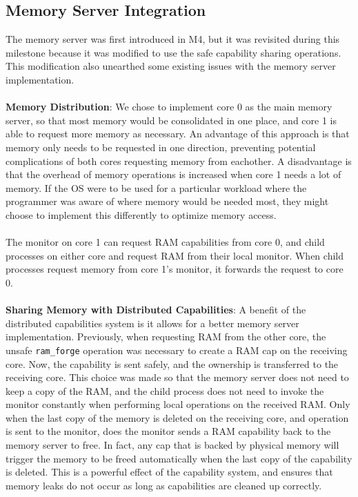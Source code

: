 \subsection{Memory Server Integration}
The memory server was first introduced in M4, but it was revisited during this milestone because it was modified to use the safe capability sharing operations. This modification also unearthed some existing issues with the memory server implementation.
\\\\
\textbf{Memory Distribution}:
We chose to implement core 0 as the main memory server, so that most memory would be consolidated in one place, and core 1 is able to request more memory as necessary. An advantage of this approach is that memory only needs to be requested in one direction, preventing potential complications of both cores requesting memory from eachother. A disadvantage is that the overhead of memory operations is increased when core 1 needs a lot of memory. If the OS were to be used for a particular workload where the programmer was aware of where memory would be needed most, they might choose to implement this differently to optimize memory access.
\\\\
The monitor on core 1 can request RAM capabilities from core 0, and child processes on either core and request RAM from their local monitor. When child processes request memory from core 1's monitor, it forwards the request to core 0.
\\\\
\textbf{Sharing Memory with Distributed Capabilities}:
A benefit of the distributed capabilities system is it allows for a better memory server implementation. Previously, when requesting RAM from the other core, the unsafe \texttt{ram\_forge} operation was necessary to create a RAM cap on the receiving core. Now, the capability is sent safely, and the ownership is transferred to the receiving core. This choice was made so that the memory server does not need to keep a copy of the RAM, and the child process does not need to invoke the monitor constantly when performing local operations on the received RAM. Only when the last copy of the memory is deleted on the receiving core, and operation is sent to the monitor, does the monitor sends a RAM capability back to the memory server to free. In fact, any cap that is backed by physical memory will trigger the memory to be freed automatically when the last copy of the capability is deleted. This is a powerful effect of the capability system, and ensures that memory leaks do not occur as long as capabilities are cleaned up correctly.
